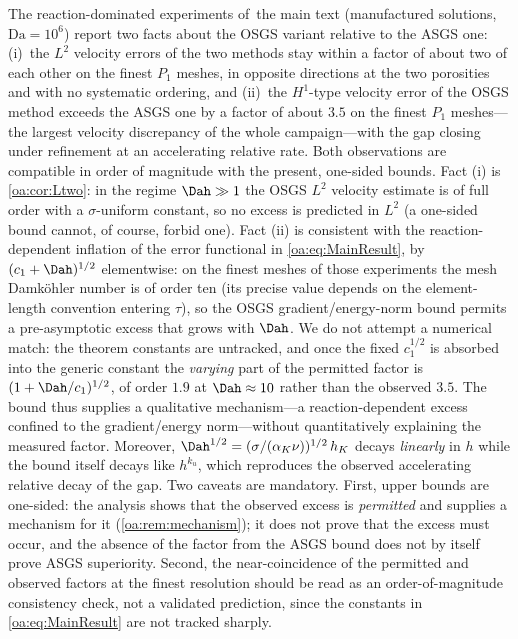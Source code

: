\begin{remark}
\label{oa:rem:numerics}
The reaction-dominated experiments of~the main text (manufactured
solutions, $\mathrm{Da} = 10^6$) report two facts about the OSGS variant relative to the ASGS
one: (i)~the $L^2$ velocity errors of the two methods stay within a factor of about two of
each other on the finest $P_1$ meshes, in opposite directions at the two porosities and with no
systematic ordering, and (ii)~the $H^1$-type velocity error of the OSGS method exceeds the
ASGS one by a factor of about $3.5$ on the finest $P_1$ meshes---the largest velocity
discrepancy of the whole campaign---with the gap closing under refinement at an
accelerating relative rate. Both observations are compatible in order of magnitude with
the present, one-sided bounds. Fact (i) is \cref{oa:cor:Ltwo}: in the regime $\Dah \gg 1$ the
OSGS $L^2$ velocity estimate is of full order with a $\sigma$-uniform constant, so no excess
is predicted in $L^2$ (a one-sided bound cannot, of course, forbid one). Fact (ii) is consistent with the
reaction{\hyp}dependent inflation of the error functional in \cref{oa:eq:MainResult}, by
$(c_1+\Dah)^{1/2}$ elementwise: on the finest meshes of those experiments the mesh
Damk\"ohler number is of order ten (its precise value depends on the element-length
convention entering $\tau$), so the OSGS gradient/energy{\hyp}norm bound permits a
pre{\hyp}asymptotic excess that grows with $\Dah$. We do not attempt a numerical match:
the theorem constants are untracked, and once the fixed $c_1^{1/2}$ is absorbed into the
generic constant the \emph{varying} part of the permitted factor is $(1+\Dah/c_1)^{1/2}$,
of order $1.9$ at $\Dah\approx10$ rather than the observed $3.5$. The bound thus supplies a
qualitative mechanism---a reaction{\hyp}dependent excess confined to the gradient/energy
norm---without quantitatively explaining the measured factor. Moreover,
$\Dah^{1/2} = (\sigma/(\alpha_K\nu))^{1/2}\, h_K$ decays \emph{linearly} in $h$ while
the bound itself decays like $h^{k_u}$, which reproduces the observed accelerating
relative decay of the gap. Two caveats are mandatory. First, upper bounds are
one-sided: the analysis shows that the observed excess is \emph{permitted} and
supplies a mechanism for it (\cref{oa:rem:mechanism}); it does not prove that the excess
must occur, and the absence of the factor from the ASGS bound does not by itself prove
ASGS superiority. Second, the near-coincidence of the permitted and observed factors
at the finest resolution should be read as an order-of-magnitude consistency check,
not a validated prediction, since the constants in \cref{oa:eq:MainResult} are not
tracked sharply.
\end{remark}

